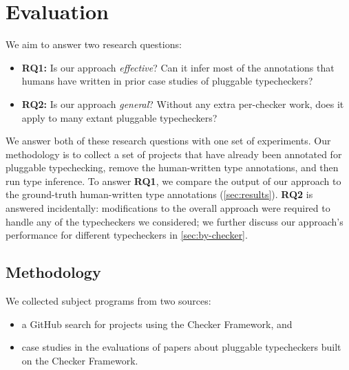\section{Evaluation}
\label{sec:evaluation}

We aim to answer two research questions:
\begin{itemize}
\item \textbf{RQ1:} Is our approach \emph{effective}?  Can it infer most of the
  annotations that humans have written in prior case studies of pluggable typecheckers?
\item \textbf{RQ2:} Is our approach \emph{general}?  Without any extra per-checker work,
  does it apply to many extant pluggable typecheckers?
\end{itemize}



We answer both of these research questions with one set of
experiments.
%
Our methodology is to collect a set of
projects that have already been annotated for pluggable typechecking,
remove the human-written type annotations,
and then run type inference.
%
To answer \textbf{RQ1}, we compare the output of our approach to the
ground-truth human-written type annotations (\cref{sec:results}).
%
\textbf{RQ2} is answered incidentally:  modifications to
the overall approach were required to handle any of the  typecheckers
we considered; we further discuss our approach's performance for different typecheckers
in \cref{sec:by-checker}.

\subsection{Methodology}
\label{sec:methodology}

We collected subject programs from two sources:
\begin{itemize}
\item a GitHub search for projects using the Checker Framework, and
\item case studies in the evaluations of papers about pluggable typecheckers built
  on the Checker Framework.
\end{itemize}


